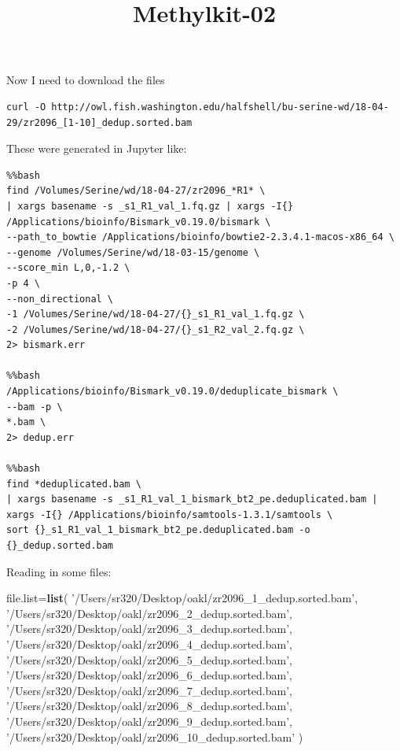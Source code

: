 \documentclass[]{article}
\title{Methylkit-02}
\author{}
\date{}
\newenvironment{Shaded}{\begin{snugshade}}{\end{snugshade}}
\newcommand{\KeywordTok}[1]{\textcolor[rgb]{0.13,0.29,0.53}{\textbf{#1}}}
\newcommand{\StringTok}[1]{\textcolor[rgb]{0.31,0.60,0.02}{#1}}
\newcommand{\NormalTok}[1]{#1}
\begin{document}
\maketitle

Now I need to download the files

\begin{verbatim}
curl -O http://owl.fish.washington.edu/halfshell/bu-serine-wd/18-04-29/zr2096_[1-10]_dedup.sorted.bam
\end{verbatim}

These were generated in Jupyter like:

\begin{verbatim}
%%bash
find /Volumes/Serine/wd/18-04-27/zr2096_*R1* \
| xargs basename -s _s1_R1_val_1.fq.gz | xargs -I{} /Applications/bioinfo/Bismark_v0.19.0/bismark \
--path_to_bowtie /Applications/bioinfo/bowtie2-2.3.4.1-macos-x86_64 \
--genome /Volumes/Serine/wd/18-03-15/genome \
--score_min L,0,-1.2 \
-p 4 \
--non_directional \
-1 /Volumes/Serine/wd/18-04-27/{}_s1_R1_val_1.fq.gz \
-2 /Volumes/Serine/wd/18-04-27/{}_s1_R2_val_2.fq.gz \
2> bismark.err

%%bash
/Applications/bioinfo/Bismark_v0.19.0/deduplicate_bismark \
--bam -p \
*.bam \
2> dedup.err

%%bash
find *deduplicated.bam \
| xargs basename -s _s1_R1_val_1_bismark_bt2_pe.deduplicated.bam | xargs -I{} /Applications/bioinfo/samtools-1.3.1/samtools \
sort {}_s1_R1_val_1_bismark_bt2_pe.deduplicated.bam -o {}_dedup.sorted.bam
\end{verbatim}

Reading in some files:

\begin{Shaded}
\begin{Highlighting}[]
\NormalTok{file.list=}\KeywordTok{list}\NormalTok{(  }\StringTok{'/Users/sr320/Desktop/oakl/zr2096_1_dedup.sorted.bam'}\NormalTok{,}
                 \StringTok{'/Users/sr320/Desktop/oakl/zr2096_2_dedup.sorted.bam'}\NormalTok{,}
                 \StringTok{'/Users/sr320/Desktop/oakl/zr2096_3_dedup.sorted.bam'}\NormalTok{,}
                 \StringTok{'/Users/sr320/Desktop/oakl/zr2096_4_dedup.sorted.bam'}\NormalTok{,}
                 \StringTok{'/Users/sr320/Desktop/oakl/zr2096_5_dedup.sorted.bam'}\NormalTok{,}
                 \StringTok{'/Users/sr320/Desktop/oakl/zr2096_6_dedup.sorted.bam'}\NormalTok{,}
                 \StringTok{'/Users/sr320/Desktop/oakl/zr2096_7_dedup.sorted.bam'}\NormalTok{,}
                 \StringTok{'/Users/sr320/Desktop/oakl/zr2096_8_dedup.sorted.bam'}\NormalTok{,}
                 \StringTok{'/Users/sr320/Desktop/oakl/zr2096_9_dedup.sorted.bam'}\NormalTok{,}
                 \StringTok{'/Users/sr320/Desktop/oakl/zr2096_10_dedup.sorted.bam'}
\NormalTok{)}
\end{Highlighting}
\end{Shaded}
\end{document}
